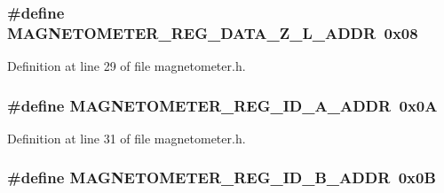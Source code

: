 \subsubsection[{\texorpdfstring{M\+A\+G\+N\+E\+T\+O\+M\+E\+T\+E\+R\+\_\+\+R\+E\+G\+\_\+\+D\+A\+T\+A\+\_\+\+Z\+\_\+\+L\+\_\+\+A\+D\+DR}{MAGNETOMETER_REG_DATA_Z_L_ADDR}}]{\setlength{\rightskip}{0pt plus 5cm}\#define M\+A\+G\+N\+E\+T\+O\+M\+E\+T\+E\+R\+\_\+\+R\+E\+G\+\_\+\+D\+A\+T\+A\+\_\+\+Z\+\_\+\+L\+\_\+\+A\+D\+DR~0x08}\hypertarget{group___magnetometer_ga5217884064bf55abf7833872dee1f8ae}{}\label{group___magnetometer_ga5217884064bf55abf7833872dee1f8ae}


Definition at line 29 of file magnetometer.\+h.

\subsubsection[{\texorpdfstring{M\+A\+G\+N\+E\+T\+O\+M\+E\+T\+E\+R\+\_\+\+R\+E\+G\+\_\+\+I\+D\+\_\+\+A\+\_\+\+A\+D\+DR}{MAGNETOMETER_REG_ID_A_ADDR}}]{\setlength{\rightskip}{0pt plus 5cm}\#define M\+A\+G\+N\+E\+T\+O\+M\+E\+T\+E\+R\+\_\+\+R\+E\+G\+\_\+\+I\+D\+\_\+\+A\+\_\+\+A\+D\+DR~0x0A}\hypertarget{group___magnetometer_gabca452ee0321f9347a20502a6543d633}{}\label{group___magnetometer_gabca452ee0321f9347a20502a6543d633}


Definition at line 31 of file magnetometer.\+h.

\subsubsection[{\texorpdfstring{M\+A\+G\+N\+E\+T\+O\+M\+E\+T\+E\+R\+\_\+\+R\+E\+G\+\_\+\+I\+D\+\_\+\+B\+\_\+\+A\+D\+DR}{MAGNETOMETER_REG_ID_B_ADDR}}]{\setlength{\rightskip}{0pt plus 5cm}\#define M\+A\+G\+N\+E\+T\+O\+M\+E\+T\+E\+R\+\_\+\+R\+E\+G\+\_\+\+I\+D\+\_\+\+B\+\_\+\+A\+D\+DR~0x0B}\hypertarget{group___magnetometer_gaf2920a552de3f733f32ce12380d01b59}{}\label{group___magnetometer_gaf2920a552de3f733f32ce12380d01b59}


